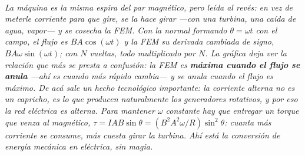 \begin{center}
\begin{tikzpicture}[scale=1]
\end{tikzpicture}\\[0.5em]
{\small\itshape La máquina es la misma espira del par magnético, pero leída al
revés: en vez de meterle corriente para que gire, se la hace girar ---con una
turbina, una caída de agua, vapor--- y se cosecha la FEM. Con la normal formando
$\theta=\omega t$ con el campo, el flujo es $BA\cos(\omega t)$ y la FEM su
derivada cambiada de signo, $BA\omega\sin(\omega t)$; con $N$ vueltas, todo
multiplicado por $N$. La gráfica deja ver la relación que más se presta a
confusión: la FEM es \textbf{máxima cuando el flujo se anula} ---ahí es cuando
más rápido cambia--- y se anula cuando el flujo es máximo. De acá sale un hecho
tecnológico importante: la corriente alterna no es un capricho, es lo que
producen naturalmente los generadores rotativos, y por eso la red eléctrica es
alterna. Para mantener $\omega$ constante hay que entregar un torque que venza
al magnético, $\tau = IAB\sin\theta = (B^2A^2\omega/R)\sin^2\theta$: cuanta más
corriente se consume, más cuesta girar la turbina. Ahí está la conversión de
energía mecánica en eléctrica, sin magia.}
\end{center}
